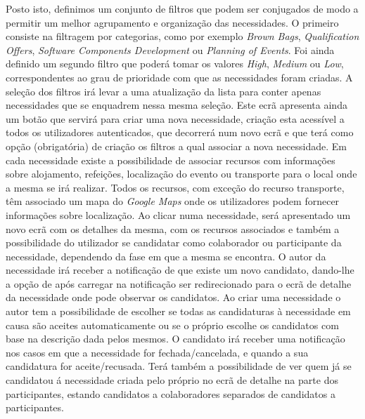 Posto isto, definimos um conjunto de filtros que podem ser conjugados de modo a permitir um melhor agrupamento e organização das necessidades. O primeiro consiste na filtragem por categorias, como por exemplo \textit{Brown Bags}, 
\textit{Qualification Offers}, \textit{Software Components Development} ou \textit{Planning of Events}. 
Foi ainda definido um segundo filtro que poderá tomar os valores \textit{High}, \textit{Medium} ou \textit{Low}, 
correspondentes ao grau de prioridade com que as necessidades foram criadas. 
A seleção dos filtros irá levar a uma atualização da lista para conter apenas necessidades que se enquadrem nessa mesma seleção. 
Este ecrã apresenta ainda um botão que servirá para criar uma nova necessidade, criação esta acessível a todos os utilizadores autenticados, 
que decorrerá num novo ecrã e que terá como opção (obrigatória) de criação os filtros a qual associar a nova necessidade. 
Em cada necessidade existe a possibilidade de associar recursos com informações sobre alojamento, refeições, localização do evento ou transporte para o local onde a mesma se irá realizar. Todos os recursos, com exceção do recurso transporte, têm associado um mapa do \textit{Google Maps} onde os utilizadores podem fornecer informações sobre localização.
Ao clicar numa necessidade, será apresentado um novo ecrã com os detalhes da mesma, com os recursos associados e também a possibilidade do utilizador se candidatar como colaborador ou participante da necessidade, dependendo da fase em que a mesma se encontra. O autor da necessidade irá receber a notificação de que existe um novo candidato, 
dando-lhe a opção de após carregar na notificação ser redirecionado para o ecrã de detalhe da necessidade onde pode observar os candidatos. 
Ao criar uma necessidade o autor tem a possibilidade de escolher se todas as candidaturas à necessidade em causa são aceites automaticamente ou se o próprio escolhe os candidatos com base na descrição dada pelos mesmos.  
O candidato irá receber uma notificação nos casos em que a necessidade for fechada/cancelada, e quando a sua candidatura for aceite/recusada. 
Terá também a possibilidade de ver quem já se candidatou á necessidade criada pelo próprio no ecrã de detalhe na parte dos participantes, estando candidatos a colaboradores separados de candidatos a participantes. 


